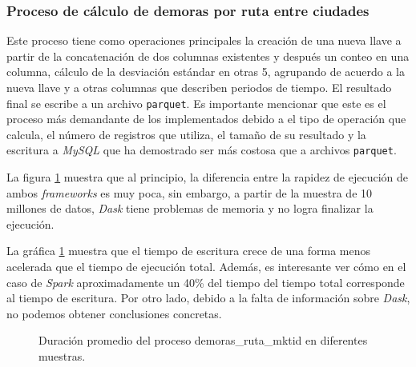 \subsubsection{Proceso de cálculo de demoras por ruta entre ciudades}

Este proceso tiene como operaciones principales la creación de una nueva llave a partir de la concatenación de dos columnas existentes y después un conteo en una columna, cálculo de la desviación estándar en otras 5, agrupando de acuerdo a la nueva llave y a otras columnas que describen periodos de tiempo. El resultado final se escribe a un archivo \texttt{parquet}. Es importante mencionar que este es el proceso más demandante de los implementados debido a el tipo de operación que calcula, el número de registros que utiliza, el tamaño de su resultado y la escritura a \textit{MySQL} que ha demostrado ser más costosa que a archivos \texttt{parquet}.

La figura \ref{lineas:local-demoras-ruta-mktid} muestra que al principio, la diferencia entre la rapidez de ejecución de ambos \textit{frameworks} es muy poca, sin embargo, a partir de la muestra de 10 millones de datos, \textit{Dask} tiene problemas de memoria y no logra finalizar la ejecución.

La gráfica \ref{lineas:local-demoras-ruta-mktid} muestra que el tiempo de escritura crece de una forma menos acelerada que el tiempo de ejecución total. Además, es interesante ver cómo en el caso de \textit{Spark} aproximadamente un 40\% del tiempo del tiempo total corresponde al tiempo de escritura. Por otro lado, debido a la falta de información sobre \textit{Dask}, no podemos obtener conclusiones concretas. 

\begin{figure}
\centering
{}
\caption{Duración promedio del proceso demoras\_ruta\_mktid en diferentes muestras.}
\label{lineas:local-demoras-ruta-mktid}
\end{figure}


